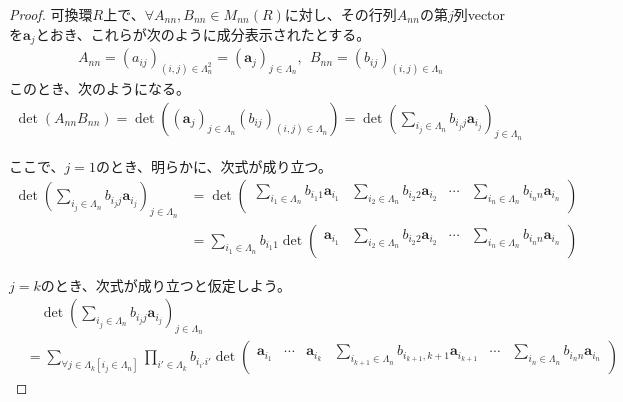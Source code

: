 \documentclass[dvipdfmx]{jsarticle}
\begin{document}
\begin{proof}
可換環$R$上で、$\forall A_{nn},B_{nn} \in M_{nn}(R)$に対し、その行列$A_{nn}$の第$j$列vectorを$\mathbf{a}_{j}$とおき、これらが次のように成分表示されたとする。
\begin{align*}
A_{nn} = \left( a_{ij} \right)_{(i,j) \in \varLambda_{n}^{2}} = \left( \mathbf{a}_{j} \right)_{j \in \varLambda_{n}},\ \ B_{nn} = \left( b_{ij} \right)_{(i,j) \in \varLambda_{n}}
\end{align*}
このとき、次のようになる。
\begin{align*}
\det\left( A_{nn}B_{nn} \right) = \det\left( \left( \mathbf{a}_{j} \right)_{j \in \varLambda_{n}}\left( b_{ij} \right)_{(i,j) \in \varLambda_{n}} \right) = \det\left( \sum_{i_{j} \in \varLambda_{n}} {b_{i_{j}j}\mathbf{a}_{i_{j}}} \right)_{j \in \varLambda_{n}}
\end{align*}\par
ここで、$j = 1$のとき、明らかに、次式が成り立つ。
\begin{align*}
\det\left( \sum_{i_{j} \in \varLambda_{n}} {b_{i_{j}j}\mathbf{a}_{i_{j}}} \right)_{j \in \varLambda_{n}} &= \det\begin{pmatrix}
\sum_{i_{1} \in \varLambda_{n}} {b_{i_{1}1}\mathbf{a}_{i_{1}}} & \sum_{i_{2} \in \varLambda_{n}} {b_{i_{2}2}\mathbf{a}_{i_{2}}} & \cdots & \sum_{i_{n} \in \varLambda_{n}} {b_{i_{n}n}\mathbf{a}_{i_{n}}} \\
\end{pmatrix}\\
&= \sum_{i_{1} \in \varLambda_{n}} b_{i_{1}1}\det\begin{pmatrix}
\mathbf{a}_{i_{1}} & \sum_{i_{2} \in \varLambda_{n}} {b_{i_{2}2}\mathbf{a}_{i_{2}}} & \cdots & \sum_{i_{n} \in \varLambda_{n}} {b_{i_{n}n}\mathbf{a}_{i_{n}}} \\
\end{pmatrix}
\end{align*}\par
$j = k$のとき、次式が成り立つと仮定しよう。
\begin{align*}
&\quad \det\left( \sum_{i_{j} \in \varLambda_{n}} {b_{i_{j}j}\mathbf{a}_{i_{j}}} \right)_{j \in \varLambda_{n}} \\
&= \sum_{\forall j \in \varLambda_{k}\left[ i_{j} \in \varLambda_{n} \right]} {\prod_{i' \in \varLambda_{k}} b_{i_{i'}i'}\det\begin{pmatrix}
\mathbf{a}_{i_{1}} & \cdots & \mathbf{a}_{i_{k}} & \sum_{i_{k + 1} \in \varLambda_{n}} {b_{i_{k + 1},k + 1}\mathbf{a}_{i_{k + 1}}} & \cdots & \sum_{i_{n} \in \varLambda_{n}} {b_{i_{n}n}\mathbf{a}_{i_{n}}} \\

\end{pmatrix}}
\end{align*}
\end{proof}
\end{document}
